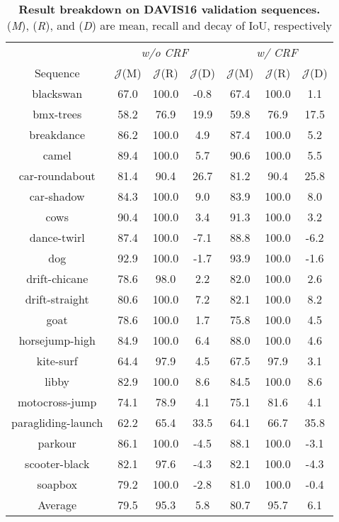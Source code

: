 \begin{table}[t]
    \begin{center}
    \begin{tabular}{cccc@{\hspace{10pt}}ccc}
        \toprule
         & \multicolumn{3}{c}{\textit{w/o CRF}} & \multicolumn{3}{c}{\textit{w/ CRF}} \\
         Sequence & $\mathcal{J}$(M) & $\mathcal{J}$(R) & $\mathcal{J}$(D) & $\mathcal{J}$(M) & $\mathcal{J}$(R) & $\mathcal{J}$(D)  \\
         \midrule
    blackswan      &  67.0 &  100.0 &  -0.8 & 67.4 &  100.0 &    1.1 \\
    bmx-trees      &  58.2 &   76.9 &  19.9 & 59.8 &   76.9 &   17.5 \\
    breakdance     &  86.2 &  100.0 &   4.9 & 87.4 &  100.0 &    5.2 \\
      camel        &  89.4 &  100.0 &   5.7 & 90.6 &  100.0 &    5.5 \\
  car-roundabout   &  81.4 &   90.4 &  26.7 & 81.2 &   90.4 &   25.8 \\
    car-shadow     &  84.3 &  100.0 &   9.0 & 83.9 &  100.0 &    8.0 \\
       cows        &  90.4 &  100.0 &   3.4 & 91.3 &  100.0 &    3.2 \\
   dance-twirl     &  87.4 &  100.0 &  -7.1 & 88.8 &  100.0 &   -6.2 \\
       dog         &  92.9 &  100.0 &  -1.7 & 93.9 &  100.0 &   -1.6 \\
  drift-chicane    &  78.6 &   98.0 &   2.2 & 82.0 &  100.0 &    2.6 \\
  drift-straight   &  80.6 &  100.0 &   7.2 & 82.1 &  100.0 &    8.2 \\
       goat        &  78.6 &  100.0 &   1.7 & 75.8 &  100.0 &    4.5 \\
  horsejump-high   &  84.9 &  100.0 &   6.4 & 88.0 &  100.0 &    4.6 \\
    kite-surf      &  64.4 &   97.9 &   4.5 & 67.5 &   97.9 &    3.1 \\
      libby        &  82.9 &  100.0 &   8.6 & 84.5 &  100.0 &    8.6 \\
  motocross-jump   &  74.1 &   78.9 &   4.1 & 75.1 &   81.6 &    4.1 \\
paragliding-launch &  62.2 &   65.4 &  33.5 & 64.1 &   66.7 &   35.8 \\
     parkour       &  86.1 &  100.0 &  -4.5 & 88.1 &  100.0 &   -3.1 \\
  scooter-black    &  82.1 &   97.6 &  -4.3 & 82.1 &  100.0 &   -4.3 \\
     soapbox       &  79.2 &  100.0 &  -2.8 & 81.0 &  100.0 &   -0.4 \\
\midrule
     Average       &  79.5 &   95.3 &   5.8 & 80.7 &   95.7 &    6.1 \\
            \bottomrule
    \end{tabular}
    \end{center}
    \caption{\textbf{Result breakdown on DAVIS16 validation sequences.} (\textit{M}), (\textit{R}), and (\textit{D}) are mean, recall and decay of IoU, respectively}
    \label{tab:supp_seq_davis}
\end{table}


